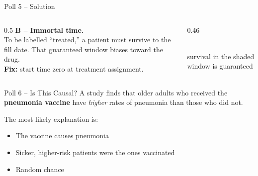 \documentclass[aspectratio=169]{beamer}
\begin{document}
\begin{frame}{Poll 5 \;--\; Solution}
  \small
  \begin{columns}[T]
    \begin{column}{0.5\textwidth}
      \textcolor{good}{\textbf{B -- Immortal time.}}\\[0.4em]
      To be labelled ``treated,'' a patient must survive to the fill date. That
      guaranteed window biases toward the drug.\\[0.3em]
      \textcolor{accent}{\textbf{Fix:}} start time zero at treatment assignment.
    \end{column}
    \begin{column}{0.46\textwidth}
      \centering
      \\[0.5em]
      {\scriptsize survival in the shaded window is guaranteed}
    \end{column}
  \end{columns}
\end{frame}

\begin{frame}{Poll 6 \;--\; Is This Causal?}
  \small
  A study finds that older adults who received the \textbf{pneumonia vaccine}
  have \emph{higher} rates of pneumonia than those who did not.
  \vspace{0.8em}

  The most likely explanation is:
  \begin{itemize}
    \item[\textbf{A.}] The vaccine causes pneumonia
    \item[\textbf{B.}] Sicker, higher-risk patients were the ones vaccinated
    \item[\textbf{C.}] Random chance
  \end{itemize}
\end{frame}
\end{document}
